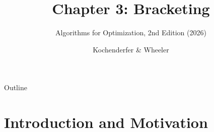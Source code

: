 \documentclass[aspectratio=169,10pt]{beamer}
\title[Chapter 3: Bracketing]{\textbf{Chapter 3: Bracketing}}
\subtitle{Algorithms for Optimization, 2nd Edition (2026)}
\author{Kochenderfer \& Wheeler}
\institute{Lecture Slides}
\date{}
\begin{document}

\begin{frame}
  \titlepage
\end{frame}

\begin{frame}{Outline}
  \tableofcontents
\end{frame}

\section{Introduction and Motivation}
\end{document}
